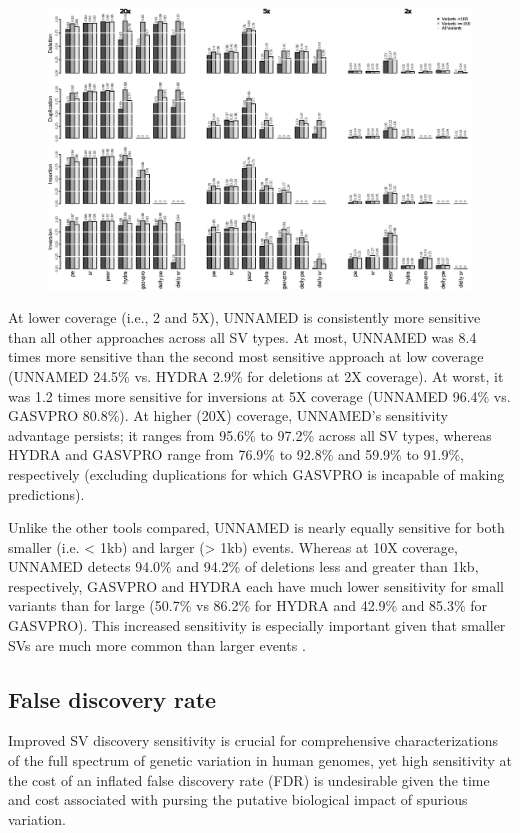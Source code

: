 \documentclass[11pt]{article}
\begin{document}
\begin{figure}
\includegraphics[width=6.5in]{fig1.eps}
\end{figure}


At lower coverage (i.e., 2 and 5X), UNNAMED is consistently more sensitive 
than all other approaches across all SV types. At most, UNNAMED was 
8.4 times more sensitive than the second most
sensitive approach at low coverage (UNNAMED 24.5\% vs. HYDRA 2.9\% for deletions
at 2X coverage). At worst, it was 1.2 times more sensitive for inversions at
5X coverage (UNNAMED 96.4\% vs. GASVPRO 80.8\%). At higher (20X) coverage, 
UNNAMED's sensitivity advantage persists; it ranges from 95.6\% to 97.2\% 
across all SV types, whereas HYDRA and GASVPRO range from 76.9\% to 92.8\% and
59.9\% to 91.9\%, respectively (excluding duplications for which GASVPRO is
incapable of making predictions).

Unlike the other tools compared, UNNAMED is nearly equally sensitive for 
both smaller (i.e. < 1kb) and larger (> 1kb) events. Whereas at 10X coverage,
UNNAMED detects 94.0\% and 94.2\% of deletions less and greater than 1kb, 
respectively, GASVPRO and HYDRA each have much lower sensitivity for small
variants than for large (50.7\% vs 86.2\% for HYDRA and 42.9\% and 85.3\% for
GASVPRO). This increased sensitivity is especially important given that smaller
SVs are much more common than larger events \cite{mills2011}.


\subsection{False discovery rate}
Improved SV discovery sensitivity is crucial for comprehensive characterizations
of the full spectrum of genetic variation in human genomes, yet high
sensitivity at the cost of an inflated false discovery rate (FDR) is
undesirable given the time and cost associated with pursing
the putative biological impact of spurious variation.
\end{document}
